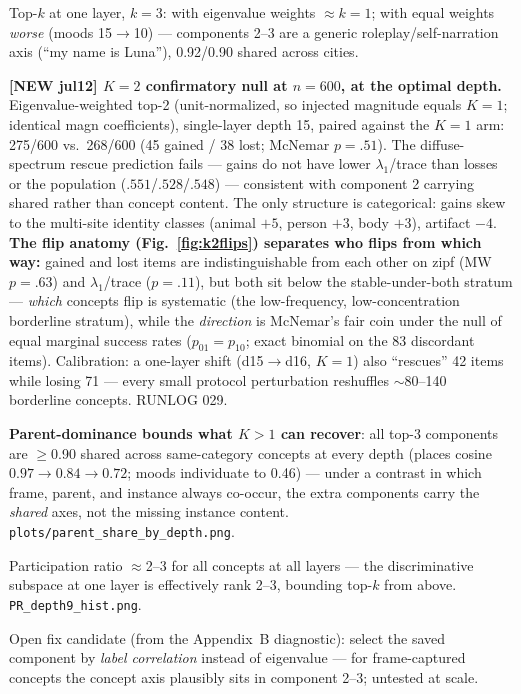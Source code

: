 \begin{outline}
\item [--] Top-$k$ at one layer, $k{=}3$: with eigenvalue weights $\approx k{=}1$; with equal weights \emph{worse} (moods 15$\to$10) --- components 2--3 are a generic roleplay/self-narration axis (``my name is Luna''), 0.92/0.90 shared across cities.
\item [--] \textbf{[NEW jul12] $K{=}2$ confirmatory null at $n{=}600$, at the optimal depth.} Eigenvalue-weighted top-2 (unit-normalized, so injected magnitude equals $K{=}1$; identical magn coefficients), single-layer depth 15, paired against the $K{=}1$ arm: 275/600 vs.\ 268/600 (45 gained / 38 lost; McNemar $p{=}.51$). The diffuse-spectrum rescue prediction fails --- gains do not have lower $\lambda_1$/trace than losses or the population ($.551$/$.528$/$.548$) --- consistent with component 2 carrying shared rather than concept content. The only structure is categorical: gains skew to the multi-site identity classes (animal $+5$, person $+3$, body $+3$), artifact $-4$. \textbf{The flip anatomy (Fig.~\ref{fig:k2flips}) separates who flips from which way:} gained and lost items are indistinguishable from each other on zipf (MW $p{=}.63$) and $\lambda_1$/trace ($p{=}.11$), but both sit below the stable-under-both stratum --- \emph{which} concepts flip is systematic (the low-frequency, low-concentration borderline stratum), while the \emph{direction} is McNemar's fair coin under the null of equal marginal success rates ($p_{01}{=}p_{10}$; exact binomial on the 83 discordant items). Calibration: a one-layer shift (d15$\to$d16, $K{=}1$) also ``rescues'' 42 items while losing 71 --- every small protocol perturbation reshuffles $\sim$80--140 borderline concepts. RUNLOG 029.
\item [?] \textbf{Parent-dominance bounds what $K{>}1$ can recover}: all top-3 components are $\geq$0.90 shared across same-category concepts at every depth (places cosine $0.97\to0.84\to0.72$; moods individuate to 0.46) --- under a contrast in which frame, parent, and instance always co-occur, the extra components carry the \emph{shared} axes, not the missing instance content. \texttt{plots/parent\_share\_by\_depth.png}.
\item [?] Participation ratio $\approx$2--3 for all concepts at all layers --- the discriminative subspace at one layer is effectively rank 2--3, bounding top-$k$ from above. \texttt{PR\_depth9\_hist.png}.
\item [?] Open fix candidate (from the Appendix~B diagnostic): select the saved component by \emph{label correlation} instead of eigenvalue --- for frame-captured concepts the concept axis plausibly sits in component 2--3; untested at scale.
\end{outline}

